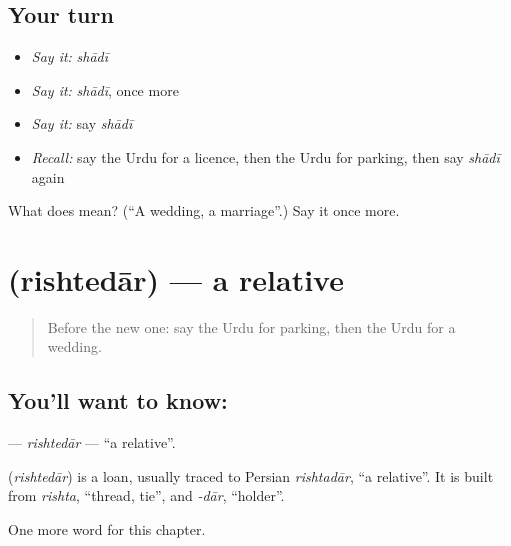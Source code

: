 \subsection*{Your turn}
\begin{itemize}
\raggedright
  \item \emph{Say it:} \emph{shādī}
  \item \emph{Say it:} \emph{shādī}, once more
  \item \emph{Say it:} say \emph{shādī}
  \item \emph{Recall:} say the Urdu for a licence, then the Urdu for parking, then say \emph{shādī} again
\end{itemize}

\begin{tcolorbox}[breakable,colback=teal!4,colframe=teal!35!black,title={Before you move on}]
What does  mean? (\textquotedblleft{}A wedding, a marriage\textquotedblright{}.) Say it once more.
\end{tcolorbox}
\section[\texorpdfstring{\ur{رشتہ} \ur{دار} (rishtedār)}{رشتہ دار (rishtedār)}]{  (rishtedār) — a relative}

\label{lesson:UR-C256-rishtedar}



\begin{quote}
Before the new one: say the Urdu for parking, then the Urdu for a wedding.
\end{quote}

\subsection*{You'll want to know:  }
\textbf{ } — \emph{rishtedār} — \textquotedblleft{}a relative\textquotedblright{}.

\begin{cousinweb}
\textbf{ } (\emph{rishtedār}) is a loan, usually traced to Persian \emph{rishtadār}, \textquotedblleft{}a relative\textquotedblright{}. It is built from \emph{rishta}, \textquotedblleft{}thread, tie\textquotedblright{}, and \emph{-dār}, \textquotedblleft{}holder\textquotedblright{}.
\end{cousinweb}

\begin{grammarlens}[title={What you've built}]
One more word for this chapter.
\end{grammarlens}

